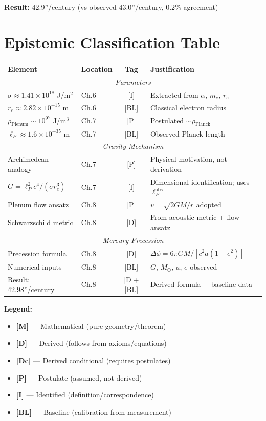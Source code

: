 \documentclass[11pt,a4paper]{article}
\begin{document}
\textbf{Result:} 42.9''/century (vs observed 43.0''/century, 0.2\% agreement)

\section{Epistemic Classification Table}
\label{sec:epistemic}

\begin{center}
\begin{tabular}{|l|l|c|p{6cm}|}
\hline
\textbf{Element} & \textbf{Location} & \textbf{Tag} & \textbf{Justification} \\
\hline
\hline
\multicolumn{4}{|c|}{\textit{Parameters}} \\
\hline
$\sigma \approx 1.41 \times 10^{18}$ J/m$^2$ & Ch.6 & [I] & Extracted from $\alpha$, $m_e$, $r_e$ \\
$r_e \approx 2.82 \times 10^{-15}$ m & Ch.6 & [BL] & Classical electron radius \\
$\rho_{\text{Plenum}} \sim 10^{97}$ J/m$^3$ & Ch.7 & [P] & Postulated $\sim \rho_{\text{Planck}}$ \\
$\ell_P \approx 1.6 \times 10^{-35}$ m & Ch.7 & [BL] & Observed Planck length \\
\hline
\multicolumn{4}{|c|}{\textit{Gravity Mechanism}} \\
\hline
Archimedean analogy & Ch.7 & [P] & Physical motivation, not derivation \\
$G = \ell_P^2 c^4/(\sigma r_e^3)$ & Ch.7 & [I] & Dimensional identification; uses $\ell_P^{\text{obs}}$ \\
Plenum flow ansatz & Ch.8 & [P] & $v = \sqrt{2GM/r}$ adopted \\
Schwarzschild metric & Ch.8 & [D] & From acoustic metric + flow ansatz \\
\hline
\multicolumn{4}{|c|}{\textit{Mercury Precession}} \\
\hline
Precession formula & Ch.8 & [D] & $\Delta\phi = 6\pi GM/[c^2 a(1-e^2)]$ \\
Numerical inputs & Ch.8 & [BL] & $G$, $M_\odot$, $a$, $e$ observed \\
Result: 42.98''/century & Ch.8 & [D]+[BL] & Derived formula + baseline data \\
\hline
\end{tabular}
\end{center}

\textbf{Legend:}
\begin{itemize}
    \item \textbf{[M]} --- Mathematical (pure geometry/theorem)
    \item \textbf{[D]} --- Derived (follows from axioms/equations)
    \item \textbf{[Dc]} --- Derived conditional (requires postulates)
    \item \textbf{[P]} --- Postulate (assumed, not derived)
    \item \textbf{[I]} --- Identified (definition/correspondence)
    \item \textbf{[BL]} --- Baseline (calibration from measurement)
\end{itemize}
\end{document}
